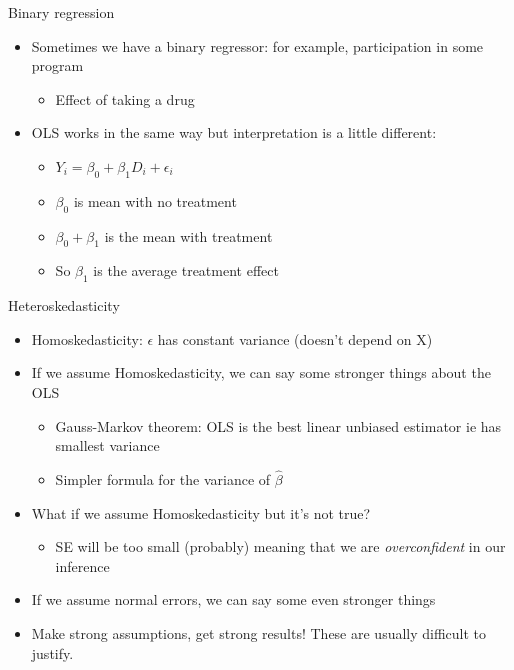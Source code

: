 \documentclass[aspectratio=169]{beamer}
\begin{document}
\begin{frame}{Binary regression}
    \begin{itemize}
        \item Sometimes we have a binary regressor: for example, participation in some program
        \begin{itemize}
            \item Effect of taking a drug
        \end{itemize}
        \item OLS works in the same way but interpretation is a little different:
        \begin{itemize}
            \item $Y_i = \beta_0 + \beta_1 D_i + \epsilon_i$
            \item $\beta_0$ is mean with no treatment
            \item $\beta_0 + \beta_1$ is the mean with treatment
            \item So $\beta_1$ is the average treatment effect
        \end{itemize}
    \end{itemize}
\end{frame}

\begin{frame}{Heteroskedasticity}
    \begin{itemize}
        \item Homoskedasticity: $\epsilon$ has constant variance (doesn't depend on X)
        \item If we assume Homoskedasticity, we can say some stronger things about the OLS
        \begin{itemize}
            \item Gauss-Markov theorem: OLS is the best linear unbiased estimator ie has smallest variance
            \item Simpler formula for the variance of $\hat{\beta}$
        \end{itemize}
        \item What if we assume Homoskedasticity but it's not true?
        \begin{itemize}
            \item SE will be too small (probably) meaning that we are \textit{overconfident} in our inference
        \end{itemize}
        \item If we assume normal errors, we can say some even stronger things
        \item Make strong assumptions, get strong results! These are usually difficult to justify.
    \end{itemize}
\end{frame}
\end{document}
